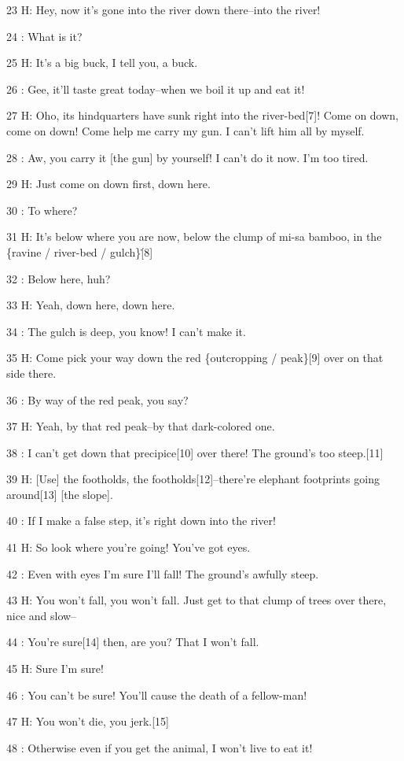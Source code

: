 23 H: Hey, now it's gone into the river down there--into the river!

24  : What is it?

25 H: It's a big buck, I tell you, a buck.

26  : Gee, it'll taste great today--when we boil it up and eat it!

27 H: Oho, its hindquarters have sunk right into the river-bed[7]! Come on down,
come on down! Come help me carry my gun. I can't lift him all by myself.

28  : Aw, you carry it [the gun] by yourself! I can't do it now. I'm too tired.

29 H: Just come on down first, down here.

30  : To where?

31 H: It's below where you are now, below the clump of mi-sa bamboo, in the \{ravine
/ river-bed / gulch\}\.[8]

32  : Below here, huh?

33 H: Yeah, down here, down here.

34  : The gulch is deep, you know! I can't make it.

35 H: Come pick your way down the red \{outcropping / peak\}[9] over on that side
there.

36  : By way of the red peak, you say?

37 H: Yeah, by that red peak--by that dark-colored one.

38  : I can't get down that precipice[10] over there! The ground's too steep.[11]

39 H: [Use] the footholds, the footholds[12]--there're elephant footprints going
around[13] [the slope].

40  : If I make a false step, it's right down into the river!

41 H: So look where you're going! You've got eyes.

42  : Even with eyes I'm sure I'll fall! The ground's awfully steep.

43 H: You won't fall, you won't fall. Just get to that clump of trees over there,
nice and slow--

44  : You're sure[14] then, are you? That I won't fall.

45 H: Sure I'm sure!

46  : You can't be sure! You'll cause the death of a fellow-man!

47 H: You won't die, you jerk.[15]

48  : Otherwise even if you get the animal, I won't live to eat it!

